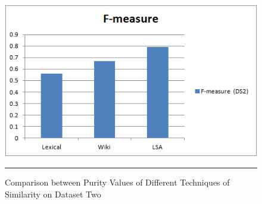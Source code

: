 \begin{figure}[htbp]
	\centering
		\includegraphics{./Figures/F_DS2_1.png}
		\rule{35em}{0.5pt}
	\caption[Comparison between Purity Values of Different Techniques of Similarity on Dataset Two]{Comparison between Purity Values of Different Techniques of Similarity on Dataset Two}
	\label{fig:F15}
\end{figure}

